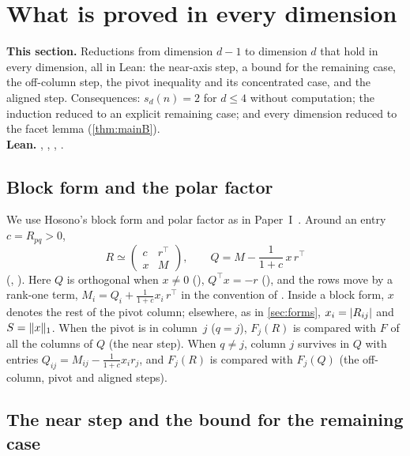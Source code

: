 \documentclass[11pt,a4paper]{article}
\begin{document}
\section{What is proved in every dimension}\label{sec:proved}

\begin{summarybox}
\textbf{This section.} Reductions from dimension $d-1$ to dimension $d$ that hold in every dimension, all in Lean: the near-axis step, a bound for the remaining case, the off-column step, the pivot inequality and its concentrated case, and the aligned step. Consequences: $s_d(n)=2$ for $d\le4$ without computation; the induction reduced to an explicit remaining case; and every dimension reduced to the facet lemma (\cref{thm:mainB}).\\
\textbf{Lean.} , , , .
\end{summarybox}

\subsection{Block form and the polar factor}
We use Hosono's block form and polar factor as in Paper~I~\cite[\S5]{cubecentre}. Around an entry $c=R_{pq}>0$,
\[
R\simeq\begin{pmatrix}c&r^\top\\x&M\end{pmatrix},\qquad Q=M-\frac{1}{1+c}\,x\,r^\top
\]
(, ). Here $Q$ is orthogonal when $x\ne0$ (), $Q^\top x=-r$ (), and the rows move by a rank-one term, $M_i=Q_i+\frac1{1+c}x_i\,r^\top$ in the convention of . Inside a block form, $x$ denotes the rest of the pivot column; elsewhere, as in \cref{sec:forms}, $x_i=\lvert R_{ij}\rvert$ and $S=\lVert x\rVert_1$. When the pivot is in column~$j$ ($q=j$), $F_j(R)$ is compared with $F$ of all the columns of $Q$ (the near step). When $q\ne j$, column $j$ survives in $Q$ with entries $Q_{ij}=M_{ij}-\frac{1}{1+c}x_ir_j$, and $F_j(R)$ is compared with $F_j(Q)$ (the off-column, pivot and aligned steps).

\subsection{The near step and the bound for the remaining case}
\end{document}
